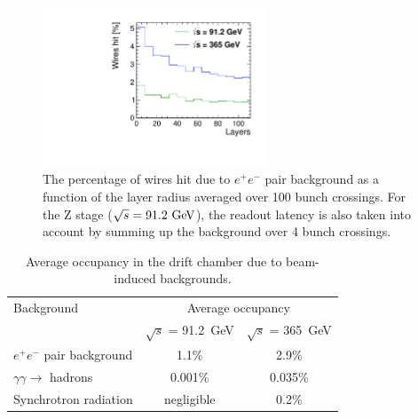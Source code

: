 \begin{figure}[ht]
\centering
\includegraphics[width=0.6\textwidth]{figures/incoherent_top_Z.pdf}
\caption{The percentage of wires hit due to $e^+e^-$ pair background as a function of the layer radius averaged over 100 bunch crossings. For the Z stage ($\sqrt{s} = 91.2\,\mathrm{\,Ge\kern -0.1em V}$), the readout latency is also taken into account by summing up the background over 4 bunch crossings.}
\label{fig_simhitspercent}
\end{figure}

\begin{table}[ht]
	\renewcommand{\arraystretch}{1.3}
	\caption{Average occupancy in the drift chamber due to beam-induced backgrounds.}
	\label{occupancy_DCH}
	\centering
	\begin{tabular}{l c c}
		\toprule
		 Background & \multicolumn{2}{c}{Average occupancy} \\
			& $\sqrt{s}$ = 91.2~GeV & $\sqrt{s}$ = 365~GeV \\
		 \midrule
		 $e^+e^-$ pair background & 1.1\% & 2.9\% \\
		 $\gamma\gamma\rightarrow$ hadrons & 0.001\% & 0.035\%  \\
		 Synchrotron radiation & negligible & 0.2\% \\
		 \bottomrule
	\end{tabular}
\end{table}
